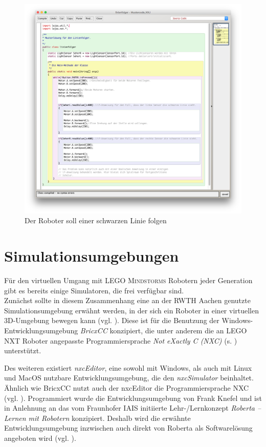 \documentclass[paper=a4, DIV=calc, BCOR=12mm, twoside=on, onecolumn=on, open = right, titlepage =on, parskip =half-, headsepline = on, footsepline = off, chapterprefix = off, appendixprefix = on, fontsize = 12pt, numbers = noenddot, abstract = on]{scrbook}
\begin{document}
\begin{figure}[htbp]
\centering
\includegraphics[width=\textwidth]{images/linienfolger_bluej.png} 
\caption{Der Roboter soll einer schwarzen Linie folgen}
\label{fig:Bsp BlueJ Linienfolger}
\end{figure} 

\par \singlespacing
\section{Simulationsumgebungen}
\label{sec:simulationsumgebungen}
\onehalfspacing
Für den virtuellen Umgang mit \textsc{LEGO Mindstorms} Robotern jeder Generation gibt es bereits einige Simulatoren, die frei verfügbar sind.\\
Zunächst sollte in diesem Zusammenhang eine an der RWTH Aachen genutzte Simulationsumgebung erwähnt werden, in der sich ein Roboter in einer virtuellen 3D-Umgebung bewegen kann (vgl. \cite{rwth}). Diese ist für die Benutzung der Windows-Entwicklungsumgebung \emph{BricxCC} konzipiert, die unter anderem die an \textsc{LEGO} NXT Roboter angepasste Programmiersprache \emph{Not eXactly C (NXC)} (s. \cite{bricxcc}) unterstützt.

Des weiteren existiert \emph{nxcEditor}, eine sowohl mit Windows, als auch mit Linux und \mbox{MacOS} nutzbare Entwicklungsumgebung, die den \emph{nxcSimulator} beinhaltet. Ähnlich wie BricxCC nutzt auch der nxcEditor die Programmiersprache NXC (vgl. \cite{nxceditor}). Programmiert wurde die Entwicklungsumgebung von Frank Knefel und ist in Anlehnung an das vom Fraunhofer IAIS initiierte Lehr-/Lernkonzept \emph{Roberta -- Lernen mit Robotern} konzipiert. Deshalb wird die erwähnte Entwicklungsumgebung inzwischen auch direkt von Roberta als Softwarelösung angeboten wird (vgl. \cite{roberta}).
\end{document}
